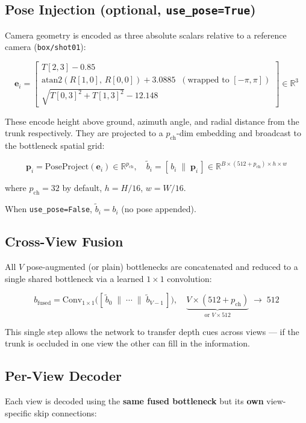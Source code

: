 \documentclass[11pt]{article}
\begin{document}
\subsection{Pose Injection (optional, \texttt{use\_pose=True})}

Camera geometry is encoded as three absolute scalars relative to a reference
camera (\texttt{box/shot01}):

\[
\mathbf{e}_i = \begin{bmatrix}
T[2,3] - 0.85 \\
\text{atan2}(R[1,0],\,R[0,0]) + 3.0885 \;\;(\text{wrapped to } [-\pi,\pi]) \\
\sqrt{T[0,3]^2 + T[1,3]^2} - 12.148
\end{bmatrix} \in \mathbb{R}^3
\]

These encode height above ground, azimuth angle, and radial distance from the
trunk respectively.  They are projected to a $p_\text{ch}$-dim embedding and
broadcast to the bottleneck spatial grid:

\[
\mathbf{p}_i = \text{PoseProject}(\mathbf{e}_i) \in \mathbb{R}^{p_\text{ch}}, \quad
\tilde{b}_i = [\,b_i \;\|\; \mathbf{p}_i\,] \in \mathbb{R}^{B \times (512 + p_\text{ch}) \times h \times w}
\]

where $p_\text{ch} = 32$ by default, $h = H/16$, $w = W/16$.

When \texttt{use\_pose=False}, $\tilde{b}_i = b_i$ (no pose appended).

\subsection{Cross-View Fusion}

All $V$ pose-augmented (or plain) bottlenecks are concatenated and reduced
to a single shared bottleneck via a learned $1\times1$ convolution:

\[
b_\text{fused} = \text{Conv}_{1\times1}\!\bigl([\,\tilde{b}_0 \;\|\; \cdots \;\|\; \tilde{b}_{V-1}\,]\bigr),
\quad
\underbrace{V \times (512 + p_\text{ch})}_{\text{or } V \times 512} \;\to\; 512
\]

This single step allows the network to transfer depth cues across views --- if
the trunk is occluded in one view the other can fill in the information.

\subsection{Per-View Decoder}

Each view is decoded using the \textbf{same fused bottleneck} but its
\textbf{own} view-specific skip connections:
\end{document}
